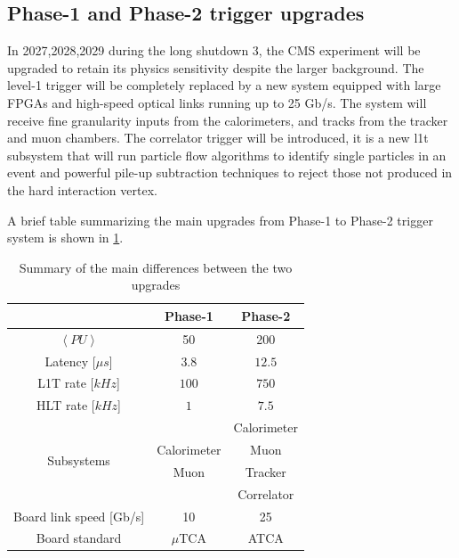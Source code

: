 \documentclass[../../main.tex]{subfiles}
\begin{document}
\clearpage
\subsection{Phase-1 and Phase-2 trigger upgrades}
\label{L1T_summary}

In 2027,2028,2029 during the long shutdown 3, the CMS experiment will be upgraded to retain its physics sensitivity despite the larger background. The level-1 trigger will be completely replaced by a new system equipped with large FPGAs and high-speed optical links running up to 25 Gb/s. The system will receive fine granularity inputs from the calorimeters, and tracks from the tracker and muon chambers. The correlator trigger will be introduced, it is a new \acrshort{l1t} subsystem that will run particle flow algorithms to identify single particles in an event and powerful pile-up subtraction techniques to reject those not produced in the hard interaction vertex.  

A brief table summarizing the main upgrades from Phase-1 to Phase-2 trigger system is shown in \ref{tab:L1T_summary}.


\begin{table}[h]
    \centering
    \begin{tabular}{|c|c|c|}
        \hline
        & Phase-1 & Phase-2 \\
        \hline
        $\left<PU\right>$            & 50    & 200    \\
        Latency [$\mu s$] & $3.8$ & $12.5$ \\
        L1T rate [$kHz$]  & $100$ & $750$  \\
        HLT rate [$kHz$]  & $1$   & $7.5$  \\
        \hline
        \multirow{4}{*}{Subsystems} &  & Calorimeter \\
                                    & Calorimeter & Muon \\
                                    & Muon & Tracker     \\
                                    & & Correlator \\
        \hline
        Board link speed [Gb/s] & 10 & 25 \\
        Board standard & $\mu$TCA  & ATCA \\
        
        
        \hline
    \end{tabular}
    \caption{Summary of the main differences between the two upgrades}
    \label{tab:L1T_summary}
\end{table}
\end{document}
